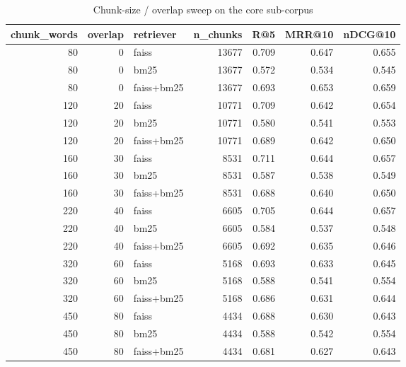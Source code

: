 \begin{table}
\caption{Chunk-size / overlap sweep on the core sub-corpus}
\label{tab:chunk}
\begin{tabular}{rrlrrrr}
\toprule
chunk\_words & overlap & retriever & n\_chunks & R@5 & MRR@10 & nDCG@10 \\
\midrule
80 & 0 & faiss & 13677 & 0.709 & 0.647 & 0.655 \\
80 & 0 & bm25 & 13677 & 0.572 & 0.534 & 0.545 \\
80 & 0 & faiss+bm25 & 13677 & 0.693 & 0.653 & 0.659 \\
120 & 20 & faiss & 10771 & 0.709 & 0.642 & 0.654 \\
120 & 20 & bm25 & 10771 & 0.580 & 0.541 & 0.553 \\
120 & 20 & faiss+bm25 & 10771 & 0.689 & 0.642 & 0.650 \\
160 & 30 & faiss & 8531 & 0.711 & 0.644 & 0.657 \\
160 & 30 & bm25 & 8531 & 0.587 & 0.538 & 0.549 \\
160 & 30 & faiss+bm25 & 8531 & 0.688 & 0.640 & 0.650 \\
220 & 40 & faiss & 6605 & 0.705 & 0.644 & 0.657 \\
220 & 40 & bm25 & 6605 & 0.584 & 0.537 & 0.548 \\
220 & 40 & faiss+bm25 & 6605 & 0.692 & 0.635 & 0.646 \\
320 & 60 & faiss & 5168 & 0.693 & 0.633 & 0.645 \\
320 & 60 & bm25 & 5168 & 0.588 & 0.541 & 0.554 \\
320 & 60 & faiss+bm25 & 5168 & 0.686 & 0.631 & 0.644 \\
450 & 80 & faiss & 4434 & 0.688 & 0.630 & 0.643 \\
450 & 80 & bm25 & 4434 & 0.588 & 0.542 & 0.554 \\
450 & 80 & faiss+bm25 & 4434 & 0.681 & 0.627 & 0.643 \\
\bottomrule
\end{tabular}
\end{table}
